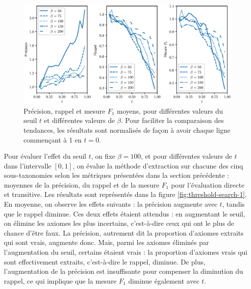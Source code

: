 \begin{figure}[h]
    \centering
    \includegraphics[width=\textwidth]{fig/plot/threshold_breakdown_aggregated.eps}
    \caption[Influence du seuil de probabilité sur l'extraction de taxonomie pour différents $\beta$]{Précision, rappel et mesure $F_1$ moyens, pour différentes valeurs du seuil $t$ et différentes valeurs de $\beta$. Pour faciliter la comparaison des tendances, les résultats sont normalisés de façon à avoir chaque ligne commençant à 1 en $t = 0$.}
    \label{fig:threshold-search-2}
\end{figure}

Pour évaluer l'effet du seuil $t$, on fixe $\beta = 100$, et pour différentes valeurs de $t$ dans l'intervalle $[0, 1]$, on évalue la méthode d'extraction sur chacune des cinq sous-taxonomies selon les métriques présentées dans la section précédente : moyennes de la précision, du rappel et de la mesure $F_1$ pour l'évaluation directe et transitive.
%
Les résultats sont représentés dans la figure \ref{fig:threshold-search-1}. %
%
En moyenne, on observe les effets suivants : la précision augmente avec $t$, tandis que le rappel diminue. Ces deux effets étaient attendus : en augmentant le seuil, on élimine les axiomes les plus incertains, c'est-à-dire ceux qui ont le plus de chance d'être faux. La précision, autrement dit la proportion d'axiomes extraits qui sont vrais, augmente donc. Mais, parmi les axiomes éliminés par l'augmentation du seuil, certains étaient vrais : la proportion d'axiomes vrais qui sont effectivement extraits, c'est-à-dire le rappel, diminue.
%
De plus, l'augmentation de la précision est insuffisante pour compenser la diminution du rappel, ce qui implique que la mesure $F_1$ diminue également avec $t$. 


